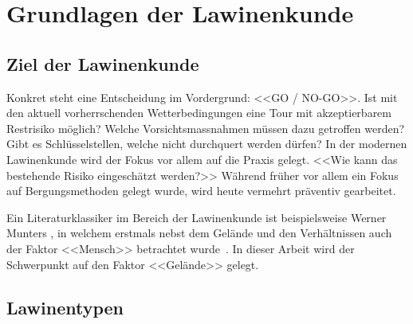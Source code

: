 \clearpage
\section{Grundlagen der Lawinenkunde}
\subsection{Ziel der Lawinenkunde}

Konkret steht eine Entscheidung im Vordergrund: <<GO / NO-GO>>. Ist mit den aktuell vorherrschenden Wetterbedingungen eine Tour mit akzeptierbarem Restrisiko möglich? Welche Vorsichtsmassnahmen müssen dazu getroffen werden? Gibt es Schlüsselstellen, welche nicht durchquert werden dürfen? In der modernen Lawinenkunde wird der Fokus vor allem auf die Praxis gelegt. <<Wie kann das bestehende Risiko eingeschätzt werden?>> Während früher vor allem ein Fokus auf Bergungsmethoden gelegt wurde, wird heute vermehrt präventiv gearbeitet.~\cite{harveyrhynerschweizerlawinenkunde}

Ein Literaturklassiker im Bereich der Lawinenkunde ist beispielsweise Werner Munters , in welchem erstmals nebst dem Gelände und den Verhältnissen auch der Faktor <<Mensch>> betrachtet wurde~\cite{munter}. In dieser Arbeit wird der Schwerpunkt auf den Faktor <<Gelände>> gelegt.

\subsection{Lawinentypen}


